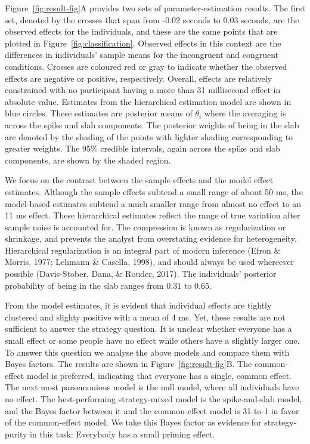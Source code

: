 \documentclass[english,man]{apa6}
\theoremstyle{definition}
\theoremstyle{definition}
\theoremstyle{remark}
\begin{document}
Figure~\ref{fig:result-fig}A provides two sets of parameter-estimation
results. The first set, denoted by the crosses that span from -0.02
seconds to 0.03 seconds, are the observed effects for the individuals,
and these are the same points that are plotted in
Figure~\ref{fig:classification}. Observed effects in this context are
the differences in individuals' sample means for the incongruent and
congruent conditions. Crosses are coloured red or gray to indicate
whether the observed effects are negative or positive, respectively.
Overall, effects are relatively constrained with no participant having a
more than 31 millisecond effect in absolute value. Estimates from the
hierarchical estimation model are shown in blue circles. These estimates
are posterior means of \(\theta_i\) where the averaging is across the
spike and slab components. The posterior weights of being in the slab
are denoted by the shading of the points with lighter shading
corresponding to greater weights. The 95\% credible intervals, again
across the spike and slab components, are shown by the shaded region.

We focus on the contrast between the sample effects and the model effect
estimates. Although the sample effects subtend a small range of about 50
ms, the model-based estimates subtend a much smaller range from almost
no effect to an 11 ms effect. These hierarchical estimates reflect the
range of true variation after sample noise is accounted for. The
compression is known as regularization or shrinkage, and prevents the
analyst from overstating evidence for heterogeneity. Hierarchical
regularization is an integral part of modern inference (Efron \& Morris,
1977; Lehmann \& Casella, 1998), and should always be used whereever
possible (Davis-Stober, Dana, \& Rouder, 2017). The individuals'
posterior probability of being in the slab ranges from 0.31 to 0.65.

From the model estimates, it is evident that individual effects are
tightly clustered and slighty positive with a mean of 4 ms. Yet, these
results are not sufficient to answer the strategy question. It is
unclear whether everyone has a small effect or some people have no
effect while others have a slightly larger one. To answer this question
we analyse the above models and compare them with Bayes factors. The
results are shown in Figure~\ref{fig:result-fig}B. The common-effect
model is preferred, indicating that everyone has a single, common
effect. The next most parsemonious model is the null model, where all
individuals have no effect. The best-performing strategy-mixed model is
the spike-and-slab model, and the Bayes factor between it and the
common-effect model is 31-to-1 in favor of the common-effect model. We
take this Bayes factor as evidence for strategy-purity in this task:
Everybody has a small priming effect.
\end{document}
